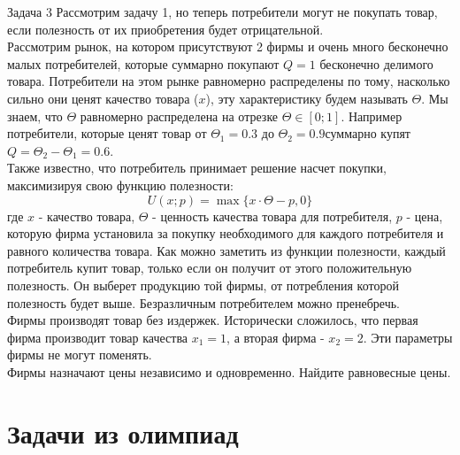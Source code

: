 \begin{mybox}{Задача 3}
    \indent\setlength{\parindent}{1em}\indent\setlength{\parindent}{1em}Рассмотрим задачу 1, но
    теперь потребители могут не покупать товар, если полезность от их приобретения будет отрицательной.\\
    \indent\setlength{\parindent}{1em}Рассмотрим рынок, на котором присутствуют 2
    фирмы и очень много бесконечно малых потребителей, которые суммарно покупают $Q=1$
    бесконечно делимого товара. Потребители на этом рынке равномерно распределены по тому, насколько сильно они ценят
    качество товара ($x$), эту характеристику будем называть $\Theta$. Мы знаем, что $\Theta$ равномерно
    распределена на отрезке $\Theta\in [0;1]$. Например потребители, которые ценят товар от $\Theta_1=0.3$ до
    $\Theta_2=0.9$суммарно купят $Q=\Theta_2-\Theta_1=0.6$.\\
    \indent\setlength{\parindent}{1em}Также известно, что потребитель принимает решение насчет покупки, максимизируя
    свою функцию полезности:
    $$U(x;p)=\max\{x\cdot\Theta-p,0\}$$
    где $x$ - качество товара, $\Theta$ - ценность качества товара для потребителя, $p$ - цена, которую фирма
    установила за покупку необходимого для каждого потребителя и равного количества товара. Как можно заметить из
    функции полезности, каждый потребитель купит товар, только если он получит от этого положительную полезность. Он
    выберет продукцию той фирмы, от потребления которой полезность будет выше. Безразличным потребителем можно пренебречь.\\
    \indent\setlength{\parindent}{1em}Фирмы производят товар без издержек. Исторически сложилось, что первая фирма
    производит товар качества $x_1=1$, а вторая фирма - $x_2=2$. Эти параметры фирмы не могут поменять.\\
    \indent\setlength{\parindent}{1em}Фирмы назначают цены независимо и одновременно. Найдите равновесные цены.
\end{mybox}


\section{Задачи из олимпиад}

